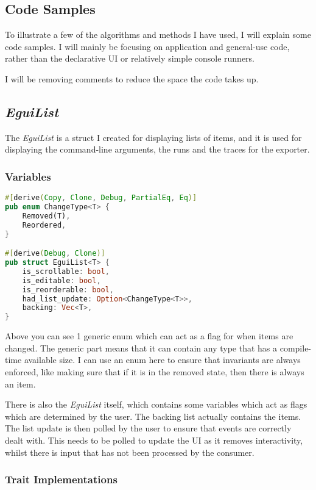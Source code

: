 \documentclass{article}
\begin{document}
\begin{multicols*}{2}


\section{Code Samples}
To illustrate a few of the algorithms and methods I have used, I will explain some code samples. I will mainly be focusing on application and general-use code, rather than the declarative UI or relatively simple console runners.

I will be removing comments to reduce the space the code takes up.

\subsection{\textit{EguiList}}
The \textit{EguiList} is a struct I created for displaying lists of items, and it is used for displaying the command-line arguments, the runs and the traces for the exporter.

\subsubsection{Variables}

\begin{lstlisting}[language=Rust]
#[derive(Copy, Clone, Debug, PartialEq, Eq)]
pub enum ChangeType<T> {
	Removed(T),
	Reordered,
}

#[derive(Debug, Clone)]
pub struct EguiList<T> {
	is_scrollable: bool,
	is_editable: bool,
	is_reorderable: bool,
	had_list_update: Option<ChangeType<T>>,
	backing: Vec<T>,
}
\end{lstlisting}

Above you can see 1 generic enum which can act as a flag for when items are changed. The generic part means that it can contain any type that has a compile-time available size. I can use an enum here to ensure that invariants are always enforced, like making sure that if it is in the removed state, then there is always an item.

There is also the \textit{EguiList} itself, which contains some variables which act as flags which are determined by the user. The backing list actually contains the items. The list update is then polled by the user to ensure that events are correctly dealt with. This needs to be polled to update the UI as it removes interactivity, whilst there is input that has not been processed by the consumer.

\subsubsection{Trait Implementations}


\end{multicols*}
\end{document}
